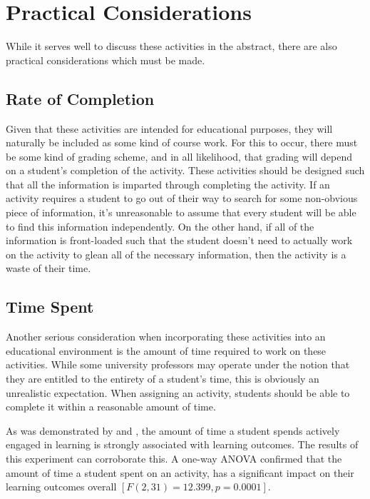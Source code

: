 \section{Practical Considerations}
    While it serves well to discuss these activities in the abstract, there are also practical considerations which must be made. 
    
    \subsection{Rate of Completion}
        Given that these activities are intended for educational purposes, they will naturally be included as some kind of course work.
        For this to occur, there must be some kind of grading scheme, and in all likelihood, that grading will depend on a student's completion of the activity. 
        These activities should be designed such that all the information is imparted through completing the activity. 
        If an activity requires a student to go out of their way to search for some non-obvious piece of information, it's unreasonable to assume that every student will be able to find this information independently. 
        On the other hand, if all of the information is front-loaded such that the student doesn't need to actually work on the activity to glean all of the necessary information, then the activity is a waste of their time. 


    \subsection{Time Spent}
        Another serious consideration when incorporating these activities into an educational environment is the amount of time required to work on these activities. 
        While some university professors may operate under the notion that they are entitled to the entirety of a student's time, this is obviously an unrealistic expectation. 
        When assigning an activity, students should be able to complete it within a reasonable amount of time. 
        
        As was demonstrated by \citeauthor{C-Linehan} and \citeauthor{Z-Zeng}, the amount of time a student spends actively engaged in learning is strongly associated with learning outcomes. 
        The results of this experiment can corroborate this. 
        A one-way ANOVA confirmed that the amount of time a student spent on an activity, has a significant impact on their learning outcomes overall $[F(2,31)=12.399, p=0.0001]$.
        
